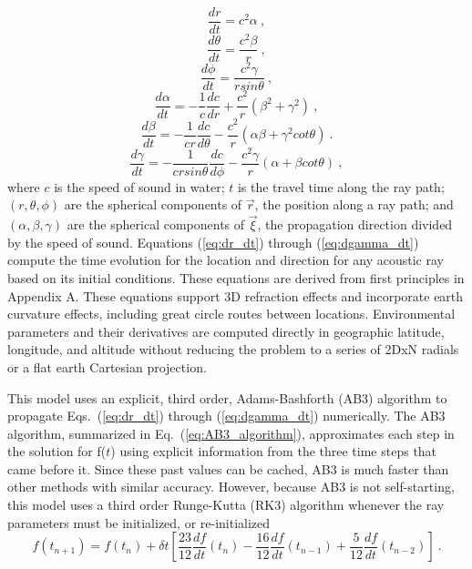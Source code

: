 \documentclass{ws-jca}
\newcommand{\threeD}{3\nobreakdash\textendash D }	%
\newcommand{\twoDxN}{2\nobreakdash\textendash DxN }
\begin{document}
\begin{equation}
	\frac{dr}{dt} = c^2 \alpha \:,
	\label{eq:dr_dt}
\end{equation}
\begin{equation}
	\frac{d\theta}{dt} = \frac{c^2 \beta}{r} \:,
	\label{eq:dtheta_dt}
\end{equation}
\begin{equation}
	\frac{d\phi}{dt} = \frac{c^2\gamma}{r sin\theta} \:,
	\label{eq:dphi_dt}
\end{equation}
\begin{equation}
	\frac{d\alpha}{dt} = -\frac{1}{c}\frac{dc}{dr} 
		+ \frac{c^2}{r}\left( \beta^2 + \gamma^2 \right) \:,
	\label{eq:dalpha_dt}
\end{equation}
\begin{equation}
	\frac{d\beta}{dt} = -\frac{1}{cr}\frac{dc}{d\theta} 
		- \frac{c^2}{r} \left( \alpha \beta + \gamma^2 cot\theta \right) \:.
	\label{eq:dbeta_dt}
\end{equation}
\begin{equation}
	\frac{d\gamma}{dt} = -\frac{1}{cr sin\theta}\frac{dc}{d\phi} 
		- \frac{c^2 \gamma}{r} \left( \alpha + \beta cot\theta \right) \:,
	\label{eq:dgamma_dt}
\end{equation}
where 
$c$ is the speed of sound in water; 
$t$ is the travel time along the ray path;
\((r,\theta,\phi)\) are the spherical components of \(\vec{r}\), the position along a ray path; and
\((\alpha,\beta,\gamma)\) are the spherical components of \(\vec{\xi}\), the propagation direction divided by the speed of sound.
Equations (\ref{eq:dr_dt}) through (\ref{eq:dgamma_dt}) compute the time
evolution for the location and direction for any acoustic ray based on its
initial conditions. These equations are derived from first principles in
Appendix A. These equations support \threeD refraction effects and
incorporate earth curvature effects, including great circle routes between
locations. Environmental parameters and their derivatives are computed
directly in geographic latitude, longitude, and altitude without reducing
the problem to a series of \twoDxN radials or a flat earth Cartesian
projection.

This model uses an explicit, third order, Adams-Bashforth (AB3)
algorithm\cite{Yakowitz1986} to propagate Eqs.~(\ref{eq:dr_dt}) through
(\ref{eq:dgamma_dt}) numerically. The AB3 algorithm, summarized in
Eq.~(\ref{eq:AB3_algorithm}), approximates each step in the solution for
f(\(t\)) using explicit information from the three time steps that
came before it. Since these past values can be cached, AB3 is much faster
than other methods with similar accuracy. However, because AB3 is not self-starting,
this model uses a third order Runge-Kutta (RK3) algorithm\cite{Press1992}
whenever the ray parameters must be initialized, or re-initialized
\begin{equation}
	f(t_{n+1}) = f(t_{n}) + \delta t \left[ 
		\frac{23}{12} \frac{df}{dt}(t_n)
	  	- \frac{16}{12} \frac{df}{dt}(t_{n-1}) 
	  	+ \frac{5}{12} \frac{df}{dt}(t_{n-2}) \right] \:.
	\label{eq:AB3_algorithm}
\end{equation}
\end{document}
